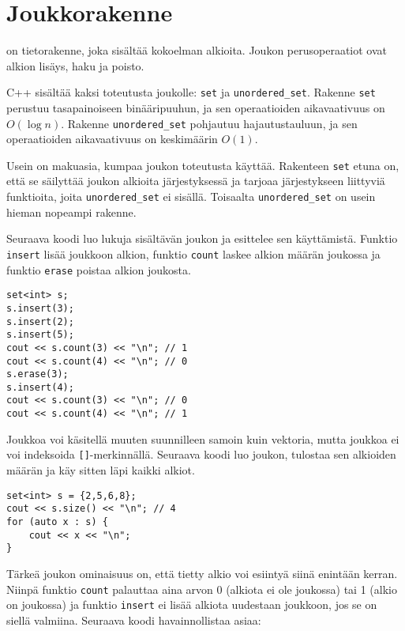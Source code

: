 \section{Joukkorakenne}


 on tietorakenne,
joka sisältää kokoelman alkioita.
Joukon perusoperaatiot ovat alkion lisäys,
haku ja poisto.

C++ sisältää kaksi
toteutusta joukolle: \texttt{set} ja \texttt{unordered\_set}.
Rakenne \texttt{set} perustuu tasapainoiseen
binääripuuhun, ja sen operaatioiden aikavaativuus
on $O(\log n)$.
Rakenne \texttt{unordered\_set} pohjautuu hajautustauluun,
ja sen operaatioiden aikavaativuus on keskimäärin $O(1)$.

Usein on makuasia, kumpaa joukon toteutusta käyttää.
Rakenteen \texttt{set} etuna on, että se säilyttää
joukon alkioita järjestyksessä ja tarjoaa
järjestykseen liittyviä funktioita,
joita \texttt{unordered\_set} ei sisällä.
Toisaalta \texttt{unordered\_set} on usein hieman nopeampi
rakenne.

Seuraava koodi luo lukuja sisältävän joukon ja
esittelee sen käyttämistä.
Funktio \texttt{insert} lisää joukkoon alkion,
funktio \texttt{count} laskee alkion määrän joukossa
ja funktio \texttt{erase} poistaa alkion joukosta.

\begin{lstlisting}
set<int> s;
s.insert(3);
s.insert(2);
s.insert(5);
cout << s.count(3) << "\n"; // 1
cout << s.count(4) << "\n"; // 0
s.erase(3);
s.insert(4);
cout << s.count(3) << "\n"; // 0
cout << s.count(4) << "\n"; // 1
\end{lstlisting}

Joukkoa voi käsitellä muuten suunnilleen samoin
kuin vektoria, mutta joukkoa ei voi indeksoida
\texttt{[]}-merkinnällä.
Seuraava koodi luo joukon, tulostaa sen 
alkioiden määrän ja käy sitten läpi kaikki alkiot.
\begin{lstlisting}
set<int> s = {2,5,6,8};
cout << s.size() << "\n"; // 4
for (auto x : s) {
    cout << x << "\n";
}
\end{lstlisting}

Tärkeä joukon ominaisuus on,
että tietty alkio voi esiintyä siinä
enintään kerran.
Niinpä funktio \texttt{count} palauttaa aina
arvon 0 (alkiota ei ole joukossa) tai 1 (alkio on joukossa)
ja funktio \texttt{insert} ei lisää alkiota
uudestaan joukkoon, jos se on siellä valmiina.
Seuraava koodi havainnollistaa asiaa:

